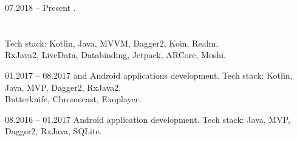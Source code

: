 \documentclass[12pt, a4paper]{article}
\newcommand{\midSectionSpace}{16pt}
\begin{document}
\begin{minipage}[t]{0.35\textwidth}
    \vspace{255pt}
    
\end{minipage}
\hspace{24pt}
\begin{minipage}[t]{0.6\textwidth}
    
    \vspace{24pt}
    
    \begin{subsec}{}{07.2018 – Present}
        \>  .   \lineend
        \>          \\
        \>        \\
        \>             \\
        \>                \lineend
        \>  Tech stack: Kotlin, Java, MVVM,  Dagger2, Koin, Realm,   \\
        \>  RxJava2, LiveData, Databinding, Jetpack, ARCore, Moshi.  \\
    \end{subsec}
    
    \vspace{\midSectionSpace}
    
    \begin{subsec}{}{01.2017 – 08.2017}
        \>   and  Android applications development.   \lineend
        \>  Tech stack: Kotlin, Java, MVP, Dagger2, RxJava2,                                        \\
        \>  Butterknife, Chromecast, Exoplayer.                                                     \\
    \end{subsec}
    
    \vspace{\midSectionSpace}
    
    \begin{subsec}{}{08.2016 – 01.2017}
        \>   Android application development.    \lineend
        \>  Tech stack: Java, MVP, Dagger2, RxJava, SQLite.             \\
    \end{subsec}


\end{minipage}
\end{document}
